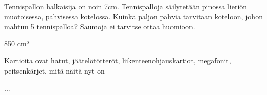 \begin{tehtava}
Tennispallon halkaisija on noin 7cm. Tennispalloja säilytetään pinossa lieriön muotoisessa, pahvisessa kotelossa. Kuinka paljon pahvia tarvitaan koteloon, johon mahtuu 5 tennispalloa? Saumoja ei tarvitse ottaa huomioon.
\begin{vastaus}
850 cm²
\end{vastaus}
\end{tehtava}

\begin{tehtava}
Kartioita ovat hatut, jäätelötötteröt, liikenteenohjauskartiot, megafonit, peitsenkärjet, mitä näitä nyt on
\begin{vastaus}
...
\end{vastaus}
\end{tehtava}


